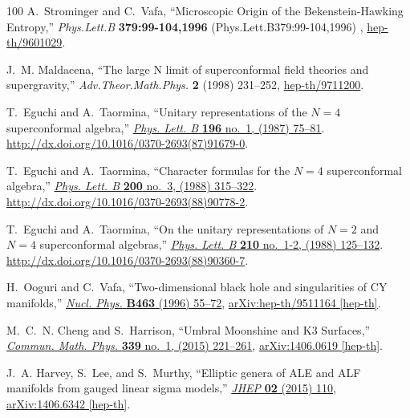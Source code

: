 \documentclass[11pt,a4paper,fontset=windows]{ctexart}
\numberwithin{equation}{section}
\begin{document}
\begin{thebibliography}{100}
A.~Strominger and C.~Vafa, ``{Microscopic Origin of the Bekenstein-Hawking
  Entropy},'' {\em Phys.Lett.B} {\bfseries 379:99-104,1996}
  (Phys.Lett.B379:99-104,1996) ,
  \href{http://arxiv.org/abs/hep-th/9601029}{{\ttfamily hep-th/9601029}}.

J.~M. Maldacena, ``The large {N} limit of superconformal field theories and
  supergravity,'' {\em Adv.Theor.Math.Phys.} {\bfseries 2} (1998) 231--252,
  \href{http://arxiv.org/abs/hep-th/9711200}{{\ttfamily hep-th/9711200}}.

T.~Eguchi and A.~Taormina, ``Unitary representations of the {$N=4$}
  superconformal algebra,''
  \href{http://dx.doi.org/10.1016/0370-2693(87)91679-0}{{\em Phys. Lett. B}
  {\bfseries 196} no.~1, (1987) 75--81}.
  \url{http://dx.doi.org/10.1016/0370-2693(87)91679-0}.

T.~Eguchi and A.~Taormina, ``Character formulas for the {$N=4$} superconformal
  algebra,'' \href{http://dx.doi.org/10.1016/0370-2693(88)90778-2}{{\em Phys.
  Lett. B} {\bfseries 200} no.~3, (1988) 315--322}.
  \url{http://dx.doi.org/10.1016/0370-2693(88)90778-2}.

T.~Eguchi and A.~Taormina, ``On the unitary representations of {$N=2$} and
  {$N=4$} superconformal algebras,''
  \href{http://dx.doi.org/10.1016/0370-2693(88)90360-7}{{\em Phys. Lett. B}
  {\bfseries 210} no.~1-2, (1988) 125--132}.
  \url{http://dx.doi.org/10.1016/0370-2693(88)90360-7}.

H.~Ooguri and C.~Vafa, ``{Two-dimensional black hole and singularities of CY
  manifolds},'' \href{http://dx.doi.org/10.1016/0550-3213(96)00008-9}{{\em
  Nucl. Phys.} {\bfseries B463} (1996) 55--72},
\href{http://arxiv.org/abs/hep-th/9511164}{{\ttfamily arXiv:hep-th/9511164
  [hep-th]}}.

M.~C.~N. Cheng and S.~Harrison, ``{Umbral Moonshine and K3 Surfaces},''
  \href{http://dx.doi.org/10.1007/s00220-015-2398-5}{{\em Commun. Math. Phys.}
  {\bfseries 339} no.~1, (2015) 221--261},
\href{http://arxiv.org/abs/1406.0619}{{\ttfamily arXiv:1406.0619 [hep-th]}}.

J.~A. Harvey, S.~Lee, and S.~Murthy, ``{Elliptic genera of ALE and ALF
  manifolds from gauged linear sigma models},''
  \href{http://dx.doi.org/10.1007/JHEP02(2015)110}{{\em JHEP} {\bfseries 02}
  (2015) 110},
\href{http://arxiv.org/abs/1406.6342}{{\ttfamily arXiv:1406.6342 [hep-th]}}.


\end{thebibliography}
\end{document}
